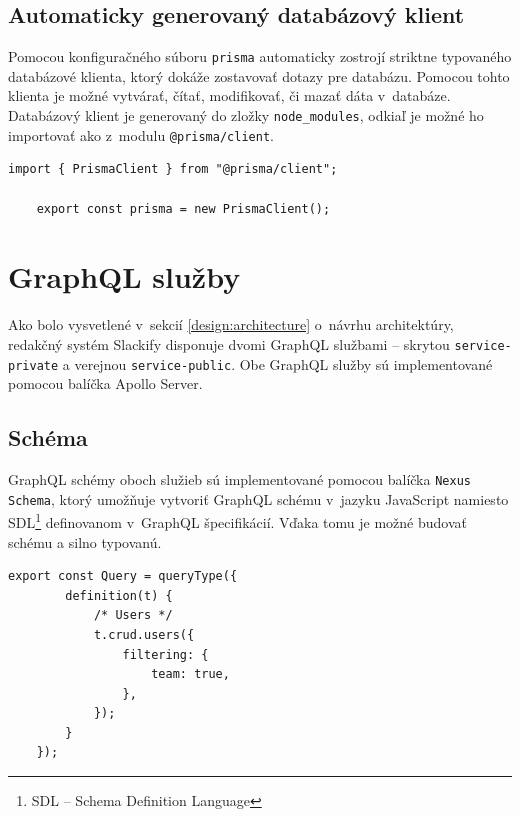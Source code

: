 \subsection{Automaticky generovaný databázový klient}
\label{impl:prisma:client}
Pomocou konfiguračného súboru \texttt{prisma} automaticky zostrojí striktne typovaného databázové klienta, ktorý dokáže zostavovať dotazy pre databázu. Pomocou tohto klienta je možné vytvárať, čítať, modifikovať, či mazať dáta v~databáze. \\

\noindent Databázový klient je generovaný do zložky \texttt{node\_modules}, odkiaľ je možné ho importovať ako z~modulu \texttt{@prisma/client}. \\

\begin{lstlisting}[caption=Príklad vytvorenia instancie databázového klienta v~Slackify.]
	import { PrismaClient } from "@prisma/client";

	export const prisma = new PrismaClient();
\end{lstlisting}

\section{GraphQL služby}
\label{impl:graphql}
Ako bolo vysvetlené v~sekcií \ref{design:architecture} o~návrhu architektúry, redakčný systém Slackify disponuje dvomi GraphQL službami -- skrytou \texttt{service-private} a verejnou \texttt{service-public}. Obe GraphQL služby sú implementované pomocou balíčka Apollo Server.

\subsection{Schéma}
GraphQL schémy oboch služieb sú implementované pomocou balíčka \texttt{Nexus Schema}, ktorý umožňuje vytvoriť GraphQL schému v~jazyku JavaScript namiesto SDL\footnote{SDL -- Schema Definition Language} definovanom v~GraphQL špecifikácií. Vďaka tomu je možné budovať schému  a silno typovanú. \\

\begin{lstlisting}[caption=Časť GraphQL schémy služby \texttt{service-private}., label={impl:code:schema}]
	export const Query = queryType({
		definition(t) {
			/* Users */
			t.crud.users({
				filtering: {
					team: true,
				},
			});
		}
	});
\end{lstlisting}

